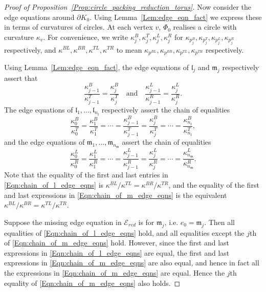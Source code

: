 \documentclass[12pt]{amsart}
\numberwithin{equation}{section}
\theoremstyle{named}
\newcommand{\refeqn}[1]{\eqref{Eqn:#1}}
\newcommand{\reflem}[1]{Lemma~\ref{Lem:#1}}
\newcommand{\refprop}[1]{Proposition~\ref{Prop:#1}}
\begin{document}
\begin{proof}[Proof of \refprop{circle_packing_reduction_torus}]
Now consider the edge equations around $\partial K_0$. Using \reflem{edge_eqn_fact} we express these in terms of curvatures of circles. At each vertex $v$, $\Phi_0$ realises a circle with curvature $\kappa_v$. For convenience, we write $\kappa_j^B, \kappa_j^T, \kappa_j^L, \kappa_j^R$ for $\kappa_{p_j^{B}}, \kappa_{p_j^T}, \kappa_{p_j^L}, \kappa_{p_j^R}$ respectively, and $\kappa^{BL}, \kappa^{BR}, \kappa^{TL}, \kappa^{TR}$ to mean $\kappa_{p^{BL}}, \kappa_{p^{BR}}, \kappa_{p^{TL}}, \kappa_{p^{TR}}$ respectively.

Using \reflem{edge_eqn_fact}, the edge equations of $\mathfrak{l}_j$ and $\mathfrak{m}_j$ respectively assert that
\[
\frac{\kappa_{j-1}^B}{\kappa_{j-1}^T} = \frac{\kappa_j^B}{\kappa_j^T}
\quad \text{and} \quad
\frac{\kappa_{j-1}^L}{\kappa_{j-1}^R} = \frac{\kappa_j^L}{\kappa_j^R}.
\] 
The edge equations of $\mathfrak{l}_1, \ldots, \mathfrak{l}_{n_\mathfrak{l}}$ respectively assert the chain of equalities
\begin{equation}
\label{Eqn:chain_of_l_edge_eqns}
\frac{\kappa_0^B}{\kappa_0^T} = \frac{\kappa_1^B}{\kappa_1^T} = \cdots = 
\frac{\kappa_{j-1}^B}{\kappa_{j-1}^T} = \frac{\kappa_j^B}{\kappa_j^T}
= \cdots = \frac{\kappa_{n_\mathfrak{l}}^B}{\kappa_{n_\mathfrak{l}}^T},
\end{equation}
and the edge equations of $\mathfrak{m}_1, \ldots, \mathfrak{m}_{n_\mathfrak{m}}$ assert the chain of equalities
\begin{equation}
\label{Eqn:chain_of_m_edge_eqns}
\frac{\kappa_0^L}{\kappa_0^R} = \frac{\kappa_1^L}{\kappa_1^R} = \cdots = 
\frac{\kappa_{j-1}^L}{\kappa_{j-1}^R} = \frac{\kappa_j^L}{\kappa_j^R}
= \cdots = \frac{\kappa_{n_\mathfrak{m}}^L}{\kappa_{n_\mathfrak{m}}^R}.
\end{equation}
Note that the equality of the first and last entries in \refeqn{chain_of_l_edge_eqns} is $\kappa^{BL}/\kappa^{TL} = \kappa^{BR}/\kappa^{TR}$, and the equality of the first and last expressions in \refeqn{chain_of_m_edge_eqns} is the equivalent $\kappa^{BL}/\kappa^{BR} = \kappa^{TL}/\kappa^{TR}$.

Suppose the missing edge equation in $\mathcal{E}_{red}$ is for $\mathfrak{m}_j$, i.e. $e_0 = \mathfrak{m}_j$. Then all equalities of \refeqn{chain_of_l_edge_eqns} hold, and all equalities except the $j$th of \refeqn{chain_of_m_edge_eqns} hold. However, since the first and last expressions in \refeqn{chain_of_l_edge_eqns} are equal, the first and last expressions in \refeqn{chain_of_m_edge_eqns} are also equal, and hence in fact all the expressions in \refeqn{chain_of_m_edge_eqns} are equal. Hence the $j$th equality of \refeqn{chain_of_m_edge_eqns} also holds. 


\end{proof}
\end{document}
